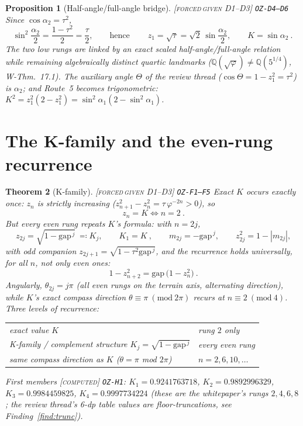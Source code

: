 \documentclass[11pt]{article}
\newcommand{\tagFD}{\textcolor{cF}{\textsc{[forced}}\,\textcolor{cD}{\textsc{given D1--D3]}}}
\newcommand{\tagC}{\textcolor{cC}{\textsc{[computed]}}}
\newcommand{\hx}[1]{\textcolor{cC}{\footnotesize\texttt{#1}}}
\newcommand{\Q}{\mathbb{Q}}
\newcommand{\gp}{\varphi}
\newcommand{\gapc}{\mathrm{gap}}
\theoremstyle{plain}
\newtheorem{theorem}{Theorem}[section]
\newtheorem{proposition}[theorem]{Proposition}
\theoremstyle{definition}
\theoremstyle{remark}
\begin{document}
\begin{proposition}[Half-angle/full-angle bridge]\label{prop:halfangle}\tagFD{} \hx{OZ-D4--D6}
Since $\cos\alpha_2=\tau^2$,
\[
\sin^2\frac{\alpha_2}{2}=\frac{1-\tau^2}{2}=\frac{\tau}{2},
\qquad\text{hence}\qquad
\boxed{\ z_1=\sqrt\tau=\sqrt2\,\sin\frac{\alpha_2}{2},\qquad K=\sin\alpha_2\ }.
\]
The two low rungs are linked by an exact scaled half-angle/full-angle relation
while remaining algebraically distinct quartic landmarks
($\Q(\sqrt\gp)\neq\Q(5^{1/4})$, W-Thm.\ 17.1). The auxiliary angle $\Theta$ of the
review thread ($\cos\Theta=1-z_1^2=\tau^2$) \emph{is} $\alpha_2$; and Route~5
becomes trigonometric: $K^2=z_1^2(2-z_1^2)=\sin^2\alpha_1(2-\sin^2\alpha_1)$.
\end{proposition}

\section{The K-family and the even-rung recurrence}\label{sec:kfamily}

\begin{theorem}[K-family]\label{thm:kfamily}\tagFD{} \hx{OZ-F1--F5}
Exact $K$ occurs exactly once: $z_n$ is strictly increasing
($z_{n+1}^2-z_n^2=\tau\,\gp^{-2n}>0$), so
\[
\boxed{\ z_n=K\iff n=2\ }.
\]
But every even rung repeats $K$'s \emph{formula}: with $n=2j$,
\[
\boxed{\ z_{2j}=\sqrt{1-\gapc^{\,j}}\ \eqqcolon K_j,\qquad K_1=K\ },
\qquad
m_{2j}=-\gapc^{\,j},\qquad z_{2j}^2=1-|m_{2j}|,
\]
with odd companion $z_{2j+1}=\sqrt{1-\tau^2\gapc^{\,j}}$, and the recurrence
holds universally, for \emph{all} $n$, not only even ones:
\[
\boxed{\ 1-z_{n+2}^2=\gapc\,\bigl(1-z_n^2\bigr)\ }.
\]
Angularly, $\theta_{2j}=j\pi$ (all even rungs on the terrain axis, alternating
direction), while $K$'s exact compass direction $\theta\equiv\pi\ (\mathrm{mod}\
2\pi)$ recurs at $n\equiv2\ (\mathrm{mod}\ 4)$. Three levels of recurrence:
\begin{center}\small
\begin{tabular}{@{}ll@{}}
\toprule
exact value $K$ & rung $2$ only\\
K-family / complement structure $K_j=\sqrt{1-\gapc^{\,j}}$ & every even rung\\
same compass direction as $K$ ($\theta=\pi$ mod $2\pi$) & $n=2,6,10,\ldots$\\
\bottomrule
\end{tabular}
\end{center}
First members \tagC{} \hx{OZ-H1}: $K_1=0.9241763718$, $K_2=0.9892996329$,
$K_3=0.9984459825$, $K_4=0.9997734224$ (these are the whitepaper's rungs
$2,4,6,8$; the review thread's 6-dp table values are floor-truncations, see
Finding~\ref{find:trunc}).
\end{theorem}
\end{document}
